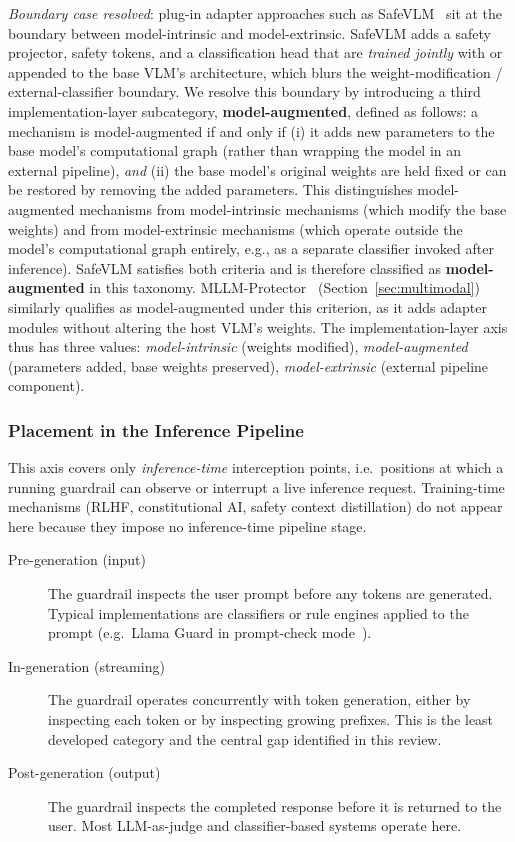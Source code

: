 \textit{Boundary case resolved}: plug-in adapter approaches such as
SafeVLM~\cite{oh2024safevlm} sit at the boundary between model-intrinsic and
model-extrinsic.
SafeVLM adds a safety projector, safety tokens, and a classification head that are
\emph{trained jointly} with or appended to the base VLM's architecture, which
blurs the weight-modification / external-classifier boundary.
We resolve this boundary by introducing a third implementation-layer subcategory,
\textbf{model-augmented}, defined as follows: a mechanism is model-augmented if and
only if (i) it adds new parameters to the base model's computational graph (rather
than wrapping the model in an external pipeline), \emph{and} (ii) the base model's
original weights are held fixed or can be restored by removing the added parameters.
This distinguishes model-augmented mechanisms from model-intrinsic mechanisms (which
modify the base weights) and from model-extrinsic mechanisms (which operate outside
the model's computational graph entirely, e.g., as a separate classifier invoked
after inference).
SafeVLM satisfies both criteria and is therefore classified as \textbf{model-augmented}
in this taxonomy.
MLLM-Protector~\cite{pi2024mllm} (Section~\ref{sec:multimodal}) similarly qualifies
as model-augmented under this criterion, as it adds adapter modules without altering
the host VLM's weights.
The implementation-layer axis thus has three values: \emph{model-intrinsic} (weights
modified), \emph{model-augmented} (parameters added, base weights preserved),
\emph{model-extrinsic} (external pipeline component).

\subsubsection{Placement in the Inference Pipeline}

This axis covers only \emph{inference-time} interception points, i.e.\ positions
at which a running guardrail can observe or interrupt a live inference request.
Training-time mechanisms (RLHF, constitutional AI, safety context distillation)
do not appear here because they impose no inference-time pipeline stage.

\begin{description}
  \item[Pre-generation (input)] The guardrail inspects the user prompt before any
        tokens are generated.
        Typical implementations are classifiers or rule engines applied to the prompt
        (e.g.\ Llama Guard in prompt-check mode~\cite{inan2023llama}).
  \item[In-generation (streaming)] The guardrail operates concurrently with token
        generation, either by inspecting each token or by inspecting growing
        prefixes.
        This is the least developed category and the central gap identified in
        this review.
  \item[Post-generation (output)] The guardrail inspects the completed response before
        it is returned to the user.
        Most LLM-as-judge and classifier-based systems operate here.
\end{description}

